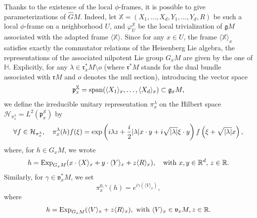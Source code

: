 \documentclass[12pt,a4paper]{amsart}
\theoremstyle{plain}
\theoremstyle{definition}
\theoremstyle{remark}
\numberwithin{equation}{section}
\theoremstyle{definition}
\def\R{{\mathbb R}}%
\def \Exp{{\rm Exp}}
\def \exp{{\rm exp}}
\def \bX{\mathbb{X}}
\def \Heis{\mathbb{H}}
\def \Ghat{\widehat{G}}
\def \cH{\mathcal{H}}
\def \fg{\mathfrak{g}}
\def \fv{\mathfrak{v}}
\def \fr{\mathfrak{r}}
\numberwithin{equation}{section}
\begin{document}
Thanks to the existence of the local $\phi$-frames, it is possible to give parameterizations of $\Ghat M$.
Indeed, let $\bX=(X_1,\dots,X_d,Y_1,\dots,Y_d,R)$ be such a local $\phi$-frame on a neighborhood $U$, and $\varphi_{U}^\bX$ be the local trivialization of 
$\fg M$ associated with the adapted frame $\langle\bX\rangle$. 
Since for any $x\in U$, the frame $\langle\bX\rangle_x$ satisfies exactly the commutator relations of the Heisenberg Lie algebra, the representations of the associated 
nilpotent Lie group $G_x M$ are given by the one of $\Heis$. Explicitly, for any $\lambda \in \fr_{x}^* M\setminus o$ (where $\fr^* M$ stands for the dual bundle associated with $\fr M$ and $o$ denotes the null section), 
introducing the vector space
\begin{equation*}
 \mathfrak{p}^{\bX}_x = {\rm span}(\langle X_1\rangle_x,\dots,\langle X_d\rangle_x) \subset \fg_x M,
\end{equation*}
we define the irreducible unitary representation $\pi_{x}^\lambda$ on the Hilbert space $\cH_{\pi_{x}^\lambda} = L^2(\mathfrak{p}^{\bX}_x)$ by
\begin{equation}
\label{eq:repgrouptangent}
 \forall f\in\cH_{\pi_{x}^\lambda},\quad \pi_{x}^\lambda(h)f(\xi) = \exp\left(i \lambda z + \frac{i}{2}|\lambda| x\cdot y + i\sqrt{|\lambda|}\xi\cdot y\right)f\left(\xi+\sqrt{|\lambda|}x\right),
\end{equation}
where, for $h\in G_x M$, we wrote 
\begin{equation*}
 h = \Exp_{G_x M}(x\cdot\langle X\rangle_x + y\cdot \langle Y\rangle_x + z\langle R \rangle_x),\quad\mbox{with}\ x,y\in\R^d,\,z\in\R.
\end{equation*}
Similarly, for $\gamma\in \fv_{x}^* M$, we set 
\begin{equation*}
 \pi_{x}^{0,\gamma}(h) = e^{i\gamma(\langle V\rangle_x)},
\end{equation*}
where
\begin{equation*}
 h=\Exp_{G_x M}(\langle V\rangle_x + z\langle R\rangle_x),\ \mbox{with}\ \langle V\rangle_x\in\fv_x M, z\in\R.
\end{equation*}
\end{document}
